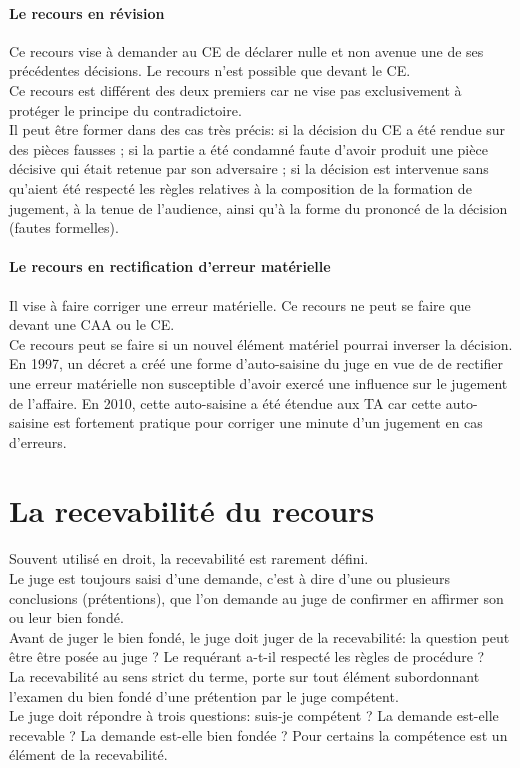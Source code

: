 \documentclass[10pt, a4paper, openany]{book}
\begin{document}
\subsubsection{Le recours en révision}

Ce recours vise à demander au CE de déclarer nulle et non avenue une de ses précédentes décisions. Le recours n'est possible que devant le CE. \\
Ce recours est différent des deux premiers car ne vise pas exclusivement à protéger le principe du contradictoire. \\
Il peut être former dans des cas très précis: si la décision du CE a été rendue sur des pièces fausses ; si la partie a été condamné faute d'avoir produit une pièce décisive qui était retenue par son adversaire ; si la décision est intervenue sans qu'aient été respecté les règles relatives à la composition de la formation de jugement, à la tenue de l'audience, ainsi qu'à la forme du prononcé de la décision (fautes formelles). 

\subsubsection{Le recours en rectification d'erreur matérielle}

Il vise à faire corriger une erreur matérielle. Ce recours ne peut se faire que devant une CAA ou le CE. \\
Ce recours peut se faire si un nouvel élément matériel pourrai inverser la décision. \\
En 1997, un décret a créé une forme d'auto-saisine du juge en vue de de rectifier une erreur matérielle non susceptible d'avoir exercé une influence sur le jugement de l'affaire. En 2010, cette auto-saisine a été étendue aux TA car cette auto-saisine est fortement pratique pour corriger une minute d'un jugement en cas d'erreurs. 

\chapter{La recevabilité du recours}

Souvent utilisé en droit, la recevabilité est rarement défini. \\
Le juge est toujours saisi d'une demande, c'est à dire d'une ou plusieurs conclusions (prétentions), que l'on demande au juge de confirmer en affirmer son ou leur bien fondé. \\
Avant de juger le bien fondé, le juge doit juger de la recevabilité: la question peut être être posée au juge ? Le requérant a-t-il respecté les règles de procédure ? \\
La recevabilité au sens strict du terme, porte sur tout élément subordonnant l'examen du bien fondé d'une prétention par le juge compétent. \\
Le juge doit répondre à trois questions: suis-je compétent ? La demande est-elle recevable ? La demande est-elle bien fondée ? Pour certains la compétence est un élément de la recevabilité. 
\end{document}
